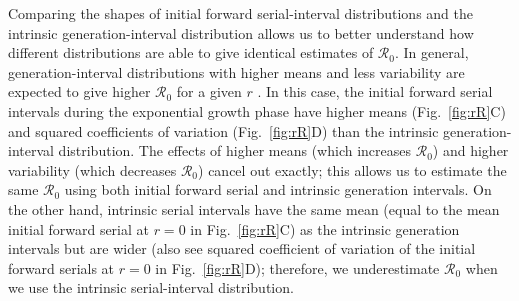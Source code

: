 \documentclass[12pt]{article}
\newcommand{\fref}[1]{Fig.~\ref{fig:#1}}
\newcommand{\Rx}[1]{\ensuremath{{\mathcal R}_{#1}}\xspace}
\newcommand{\Ro}{\Rx{0}}
\begin{document}
Comparing the shapes of initial forward serial-interval distributions and the intrinsic generation-interval distribution allows us to better understand how different distributions are able to give identical estimates of \Ro.
In general, generation-interval distributions with higher means and less variability are expected to give higher \Ro for a given $r$ \citep{wallinga2007generation, park2019practical}.
In this case, the initial forward serial intervals during the exponential growth phase have higher means (\fref{rR}C) and squared coefficients of variation (\fref{rR}D) than the intrinsic generation-interval distribution.
The effects of higher means (which increases \Ro) and higher variability (which decreases \Ro) cancel out exactly;
this allows us to estimate the same \Ro using both initial forward serial and intrinsic generation intervals.
On the other hand, intrinsic serial intervals have the same mean (equal to the mean initial forward serial at $r=0$ in \fref{rR}C) as the intrinsic generation intervals but are wider (also see squared coefficient of variation of the initial forward serials at $r=0$ in \fref{rR}D); 
therefore, we underestimate \Ro when we use the intrinsic serial-interval distribution.
\end{document}
